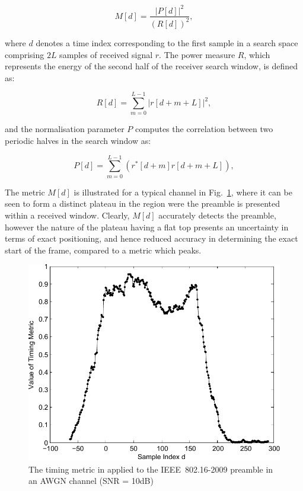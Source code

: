 \begin{center}
\begin{equation}
\label{MMetric}
M[d] = \frac{|P[d]|^2} {(R[d])^2},
\end{equation}
\end{center} 

where $d$ denotes a time index corresponding to the first sample in a search space comprising $2L$ samples of received signal $r$. The power measure $R$, which represents the energy of the second half of the receiver search window, is defined as:

\begin{center}
\begin{equation}
\label{RMetric}
R[d] =\sum_{m =0}^{L-1}   |r[d+m+L]|^2,
\end{equation}
\end{center} 

and the normalisation parameter $P$ computes the correlation between two periodic halves in the search window as:

\begin{center}
\begin{equation}
\label{PMetric}
P[d] =\sum_{m =0}^{L-1}    (r^{*}[d+m] r[d+m+L] ),
\end{equation}
\end{center} 


The metric $M[d]$ is illustrated for a typical channel in Fig.~\ref{fig:M1-10dB}, where it can be seen to form a distinct plateau in the region were the preamble is presented within a received window. 
Clearly, $M[d]$ accurately detects the preamble, however the nature of the plateau having a flat top presents an uncertainty in terms of exact positioning, and hence reduced accuracy in determining the exact start of the frame, compared to a metric which peaks.

\begin{figure}
	\centerline{\includegraphics [width=0.8\columnwidth] {figures/M1_10dB.pdf} }
	\caption{The timing metric in \cite{Schmidl1997} applied to the IEEE~802.16-2009 preamble in an AWGN channel (SNR = 10dB)}
	\label{fig:M1-10dB}
\end{figure}

